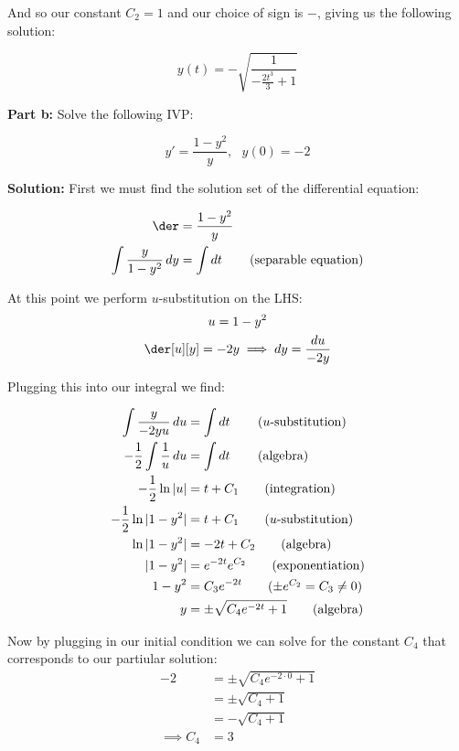 \documentclass{article}
\begin{document}
And so our constant $C_2=1$ and our choice of sign is $-$, giving us the following solution:

\begin{equation*}
    y(t)=-\sqrt{\frac{1}{-\frac{2t^3}{3}+1}}
\end{equation*}
\bigskip

\noindent\textbf{Part b:} Solve the following IVP:

\begin{equation*}
    y'=\frac{1-y^2}{y},\,\,\,\, y(0)=-2
\end{equation*}
\smallskip

\noindent\textbf{Solution:} First we must find the solution set of the differential equation:

\begin{align*}
    \der&=\frac{1-y^2}{y}\\
    \int\frac{y}{1-y^2}\mathop{dy}&=\int\mathop{dt}\tag{separable equation}\\
\end{align*}

At this point we perform $u$-substitution on the LHS:
\begin{gather*}
    u=1-y^2\\
    \der[u][y]=-2y\implies dy=\frac{du}{-2y}
\end{gather*}

Plugging this into our integral we find:

\begin{align*}
    \int\frac{y}{-2yu}\mathop{du}&=\int\mathop{dt}\tag{$u$-substitution}\\
    -\frac{1}{2}\int\frac{1}{u}\mathop{du}&=\int\mathop{dt}\tag{algebra}\\
    -\frac{1}{2}\ln|u|&=t+C_1\tag{integration}\\
    -\frac{1}{2}\ln|1-y^2|&=t+C_1\tag{$u$-substitution}\\
    \ln|1-y^2|&=-2t+C_2\tag{algebra}\\
    |1-y^2|&=e^{-2t}e^{C_2}\tag{exponentiation}\\
    1-y^2&=C_3e^{-2t}\tag{$\pm e^{C_2}=C_3\not=0$}\\
    y&=\pm\sqrt{C_4e^{-2t}+1}\tag{algebra}
\end{align*}

Now by plugging in our initial condition we can solve for the constant $C_4$ that corresponds to our partiular solution:
\begin{align*}
    -2&=\pm\sqrt{C_4e^{-2\cdot0}+1}\tag{$(t,y)=(0,-2)$}\\
    &=\pm\sqrt{C_4+1}\\
    &=-\sqrt{C_4+1}\tag{$+$ case impossible}\\
    \implies C_4&=3
\end{align*}
\end{document}
